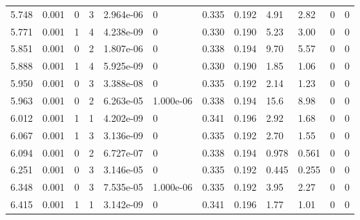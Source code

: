 \documentclass[preview]{standalone}
\begin{document}
{{{\begin{tabular}{L{1.2cm}C{1.2cm} C{0.3cm}C{0.5cm} C{1.4cm}C{1.4cm} C{1.4cm}C{1.4cm} C{1.6cm}C{1.6cm} C{1.6cm}C{1.6cm}}
  5.748  &  0.001  & 0     &  3 &  2.964e-06  & 0  &  0.335&   0.192& 4.91 & 2.82   &  0 & 0  \\ 
  5.771  &  0.001  & 1     &  4 &  4.238e-09  & 0  &  0.330&   0.190& 5.23 & 3.00   &  0 & 0  \\ 
  5.851  &  0.001  & 0     &  2 &  1.807e-06  & 0  &  0.338&   0.194& 9.70 & 5.57   &  0 & 0  \\ 
  5.888  &  0.001  & 1     &  4 &  5.925e-09  & 0  &  0.330&   0.190& 1.85 & 1.06   &  0 & 0  \\ 
  5.950  &  0.001  & 0     &  3 &  3.388e-08  & 0  &  0.335&   0.192& 2.14 & 1.23   &  0 & 0  \\ 
  5.963  &  0.001  & 0     &  2 &  6.263e-05  & 1.000e-06  &  0.338&   0.194& 15.6 & 8.98   &  0 & 0  \\ 
  6.012  &  0.001  & 1     &  1 &  4.202e-09  & 0  &  0.341&   0.196& 2.92 & 1.68   &  0 & 0  \\ 
  6.067  &  0.001  & 1     &  3 &  3.136e-09  & 0  &  0.335&   0.192& 2.70 & 1.55   &  0 & 0  \\ 
  6.094  &  0.001  & 0     &  2 &  6.727e-07  & 0  &  0.338&   0.194& 0.978 & 0.561   &  0 & 0  \\ 
  6.251  &  0.001  & 0     &  3 &  3.146e-05  & 0  &  0.335&   0.192& 0.445 & 0.255   &  0 & 0  \\ 
  6.348  &  0.001  & 0     &  3 &  7.535e-05  & 1.000e-06  &  0.335&   0.192& 3.95 & 2.27   &  0 & 0  \\ 
  6.415  &  0.001  & 1     &  1 &  3.142e-09  & 0  &  0.341&   0.196& 1.77 & 1.01   &  0 & 0  \\ 
\hline 
\end{tabular} 

}}}
\end{document}
